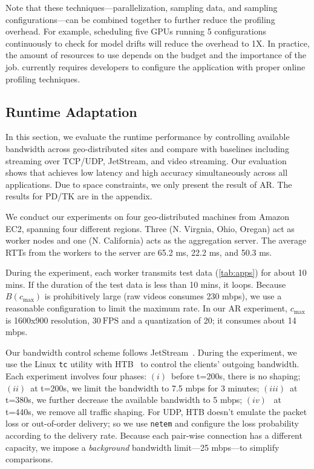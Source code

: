 Note that these techniques---parallelization, sampling data, and sampling
configurations---can be combined together to further reduce the profiling
overhead. For example, scheduling five GPUs running 5 configurations
continuously to check for model drifts will reduce the overhead to 1X\@. In
practice, the amount of resources to use depends on the budget and the
importance of the job. \sysname{} currently requires developers to configure the
application with proper online profiling techniques.


\subsection{Runtime Adaptation}
\label{sec:runtime-adaptation}

In this section, we evaluate the runtime performance by controlling available
bandwidth across geo-distributed sites and compare \sysname{} with baselines
including streaming over TCP/UDP, JetStream, and video streaming. Our evaluation
shows that \sysname{} achieves low latency and high accuracy simultaneously
across all applications. Due to space constraints, we only present the result of
AR. The results for PD/TK are in the appendix.

 We conduct our experiments on four geo-distributed
machines from Amazon EC2, spanning four different regions. Three (N. Virgnia,
Ohio, Oregan) act as worker nodes and one (N. California) acts as the
aggregation server. The average RTTs from the workers to the server are 65.2 ms,
22.2 ms, and 50.3 ms.

During the experiment, each worker transmits test data (\autoref{tab:apps}) for
about 10 mins. If the duration of the test data is less than 10 mins, it
loops. Because $B(c_{\max})$ is prohibitively large (raw videos consumes 230
mbps), we use a reasonable configuration to limit the maximum rate. In our AR
experiment, $c_{\max}$ is 1600x900 resolution, \(30~\text{FPS}\) and a
quantization of 20; it consumes about 14 mbps.

Our bandwidth control scheme follows
JetStream~\cite{rabkin2014aggregation}. During the experiment, we use the Linux
\texttt{tc} utility with HTB~\cite{htb, lartc} to control the clients' outgoing
bandwidth. Each experiment involves four phases: $(i)$~before t=200s, there is
no shaping; $(ii)$~at t=200s, we limit the bandwidth to 7.5 mbps for 3 minutes;
$(iii)$~at t=380s, we further decrease the available bandwidth to 5 mbps;
$(iv)$~ at t=440s, we remove all traffic shaping. For UDP, HTB doesn't emulate
the packet loss or out-of-order delivery; so we use \texttt{netem} and configure
the loss probability according to the delivery rate. Because each pair-wise
connection has a different capacity, we impose a \textit{background} bandwidth
limit---25 mbps---to simplify comparisons.

